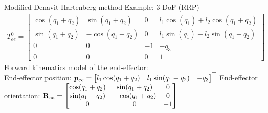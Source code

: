 \begin{frame}{Modified Denavit-Hartenberg method}
	Example: 3 DoF (RRP) 
	\begin{align*}
		T_{ee}^0 =\begin{bmatrix}
			\cos(q_1+q_2)&\sin(q_1+q_2)&0&l_1\cos(q_1)+l_2\cos(q_1+q_2)\\
			\sin(q_1+q_2)&-\cos(q_1+q_2)&0&l_1\sin(q_1)+l_2\sin(q_1+q_2)\\
			0&0&-1&-q_3\\
			0&0&0&1
		\end{bmatrix}
	\end{align*}
	Forward kinematics model of the end-effector: \\
	End-effector position: $\bm{p}_{ee}= \begin{bmatrix}
		l_1\cos(q_1+q_2)&l_1\sin(q_1+q_2)&-q_3
	\end{bmatrix}^\top$
	End-effector orientation: $\mathbf{R}_{ee}= \begin{bmatrix}
	\cos(q_1+q_2)&\sin(q_1+q_2)&0\\
	\sin(q_1+q_2)&-\cos(q_1+q_2)&0\\
	0&0&-1
	\end{bmatrix}$
\end{frame}

